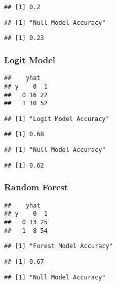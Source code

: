 \documentclass[
]{article}
\begin{document}
\begin{verbatim}
## [1] 0.2
\end{verbatim}

\begin{verbatim}
## [1] "Null Model Accuracy"
\end{verbatim}

\begin{verbatim}
## [1] 0.23
\end{verbatim}

\hypertarget{logit-model-1}{%
\subsubsection{Logit Model}\label{logit-model-1}}

\begin{verbatim}
##    yhat
## y    0  1
##   0 16 22
##   1 10 52
\end{verbatim}

\begin{verbatim}
## [1] "Logit Model Accuracy"
\end{verbatim}

\begin{verbatim}
## [1] 0.68
\end{verbatim}

\begin{verbatim}
## [1] "Null Model Accuracy"
\end{verbatim}

\begin{verbatim}
## [1] 0.62
\end{verbatim}

\hypertarget{random-forest-1}{%
\subsubsection{Random Forest}\label{random-forest-1}}

\begin{verbatim}
##    yhat
## y    0  1
##   0 13 25
##   1  8 54
\end{verbatim}

\begin{verbatim}
## [1] "Forest Model Accuracy"
\end{verbatim}

\begin{verbatim}
## [1] 0.67
\end{verbatim}

\begin{verbatim}
## [1] "Null Model Accuracy"
\end{verbatim}
\end{document}
